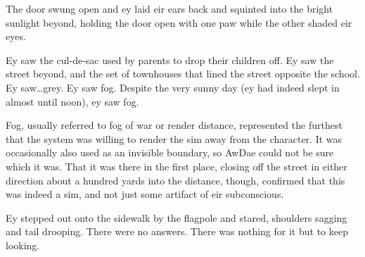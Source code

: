 The door swung open and ey laid eir ears back and squinted into the bright sunlight beyond, holding the door open with one paw while the other shaded eir eyes.

Ey saw the cul-de-sac used by parents to drop their children off. Ey saw the street beyond, and the set of townhouses that lined the street opposite the school. Ey saw\ldots{}grey. Ey saw fog. Despite the very sunny day (ey had indeed slept in almost until noon), ey saw fog.

Fog, usually referred to fog of war or render distance, represented the furthest that the system was willing to render the sim away from the character. It was occasionally also used as an invisible boundary, so AwDae could not be sure which it was. That it was there in the first place, closing off the street in either direction about a hundred yards into the distance, though, confirmed that this was indeed a sim, and not just some artifact of eir subconscious.

Ey stepped out onto the sidewalk by the flagpole and stared, shoulders sagging and tail drooping. There were no answers. There was nothing for it but to keep looking.
